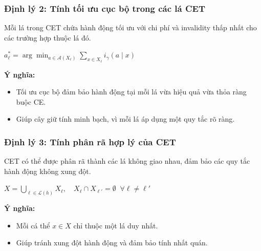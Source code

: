 \documentclass[notheorems, aspectratio=149]{beamer}
\begin{document}
\begin{frame}
    \frametitle{Định lý 2: Tính tối ưu cục bộ trong các lá CET}

    \begin{tcolorbox}[custombox]
        Mỗi lá trong CET chứa hành động tối ưu với chi phí và invalidity thấp nhất cho các trường hợp thuộc lá đó.
    \end{tcolorbox}

    \begin{center}       
    \begin{highlightformula}    
        $\displaystyle a_\ell^* = \arg\min_{a \in \mathcal{A}(X_\ell)} \sum_{x \in X_\ell} i_\gamma(a \mid x)$
    \end{highlightformula}
    \end{center}

    \textbf{Ý nghĩa:}
    \begin{itemize}
        \item Tối ưu cục bộ đảm bảo hành động tại mỗi lá vừa hiệu quả vừa thỏa ràng buộc CE.
        \item Giúp cây giữ tính minh bạch, vì mỗi lá áp dụng một quy tắc rõ ràng.
    \end{itemize}
\end{frame}

\begin{frame}
    \frametitle{Định lý 3: Tính phân rã hợp lý của CET}

    \begin{tcolorbox}[custombox]
        CET có thể được phân rã thành các lá không giao nhau, đảm bảo các quy tắc hành động không xung đột.
    \end{tcolorbox}

    \begin{center}    
    \begin{highlightformula}
        $X = \bigcup_{\ell \in \mathcal{L}(h)} X_\ell, \quad X_\ell \cap X_{\ell'} = \emptyset \;\; \forall \ell \neq \ell'$
    \end{highlightformula}
    \end{center}
    
    \textbf{Ý nghĩa:}
    \begin{itemize}
        \item Mỗi cá thể $x \in X$ chỉ thuộc một lá duy nhất.
        \item Giúp tránh xung đột hành động và đảm bảo tính nhất quán.
    \end{itemize}
\end{frame}
\end{document}

